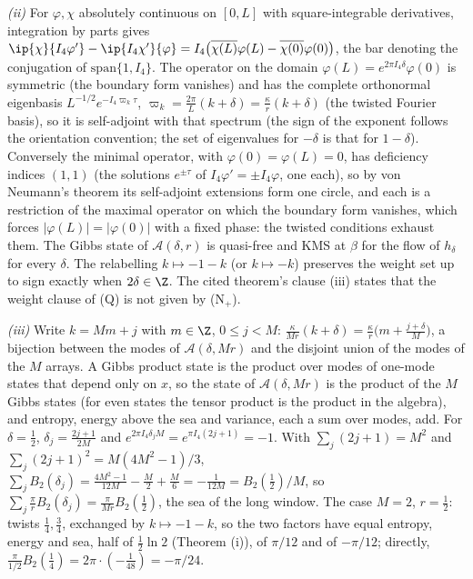 \emph{(ii)} For $\varphi, \chi$ absolutely continuous on $[0, L]$ with square-integrable derivatives, integration by parts gives $\ip{\chi}{I_4\varphi'} - \ip{I_4\chi'}{\varphi} = I_4\bigl(\overline{\chi(L)}\varphi(L) - \overline{\chi(0)}\varphi(0)\bigr)$, the bar denoting the conjugation of $\mathrm{span}\{1, I_4\}$. The operator on the domain $\varphi(L) = e^{2\pi I_4\delta}\varphi(0)$ is symmetric (the boundary form vanishes) and has the complete orthonormal eigenbasis $L^{-1/2}e^{-I_4\varpi_{k}\tau}$, $\varpi_{k} = \tfrac{2\pi}{L}(k + \delta) = \tfrac{\kappa}{r}(k + \delta)$ (the twisted Fourier basis), so it is self-adjoint with that spectrum (the sign of the exponent follows the orientation convention; the set of eigenvalues for $-\delta$ is that for $1 - \delta$). Conversely the minimal operator, with $\varphi(0) = \varphi(L) = 0$, has deficiency indices $(1, 1)$ (the solutions $e^{\pm\tau}$ of $I_4\varphi' = \pm I_4\varphi$, one each), so by von Neumann's theorem its self-adjoint extensions form one circle, and each is a restriction of the maximal operator on which the boundary form vanishes, which forces $|\varphi(L)| = |\varphi(0)|$ with a fixed phase: the twisted conditions exhaust them. The Gibbs state of $\mathcal{A}(\delta, r)$ is quasi-free and KMS at $\beta$ for the flow of $h_{\delta}$ for every $\delta$. The relabelling $k \mapsto -1 - k$ (or $k \mapsto -k$) preserves the weight set up to sign exactly when $2\delta \in \Z$. The cited theorem's clause (iii) states that the weight clause of (Q) is not given by (N$_{+}$).

\emph{(iii)} Write $k = Mm + j$ with $m \in \Z$, $0 \le j < M$: $\tfrac{\kappa}{Mr}(k + \delta) = \tfrac{\kappa}{r}\bigl(m + \tfrac{j + \delta}{M}\bigr)$, a bijection between the modes of $\mathcal{A}(\delta, Mr)$ and the disjoint union of the modes of the $M$ arrays. A Gibbs product state is the product over modes of one-mode states that depend only on $x$, so the state of $\mathcal{A}(\delta, Mr)$ is the product of the $M$ Gibbs states (for even states the tensor product is the product in the algebra), and entropy, energy above the sea and variance, each a sum over modes, add. For $\delta = \tfrac12$, $\delta_{j} = \tfrac{2j + 1}{2M}$ and $e^{2\pi I_4\delta_{j}M} = e^{\pi I_4(2j + 1)} = -1$. With $\sum_{j}(2j + 1) = M^{2}$ and $\sum_{j}(2j + 1)^{2} = M(4M^{2} - 1)/3$, $\sum_{j}B_{2}(\delta_{j}) = \tfrac{4M^{2} - 1}{12M} - \tfrac{M}{2} + \tfrac{M}{6} = -\tfrac{1}{12M} = B_{2}(\tfrac12)/M$, so $\sum_{j}\tfrac{\pi}{r}B_{2}(\delta_{j}) = \tfrac{\pi}{Mr}B_{2}(\tfrac12)$, the sea of the long window. The case $M = 2$, $r = \tfrac12$: twists $\tfrac14, \tfrac34$, exchanged by $k \mapsto -1 - k$, so the two factors have equal entropy, energy and sea, half of $\tfrac12\ln 2$ (Theorem (i)), of $\pi/12$ and of $-\pi/12$; directly, $\tfrac{\pi}{1/2}B_{2}(\tfrac14) = 2\pi\cdot(-\tfrac{1}{48}) = -\pi/24$.

